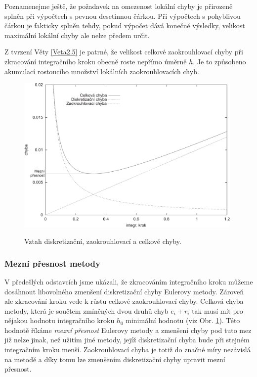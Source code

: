 \documentclass[a4paper, 12pt]{book}
\theoremstyle{definition}
\begin{document}
Poznamenejme ještě, že požadavek na omezenost lokální chyby je přirozeně splněn 
při výpočtech s pevnou desetinnou čárkou. Při výpočtech s pohyblivou čárkou je 
fakticky splněn tehdy, pokud výpočet dává konečné výsledky, velikost maximální 
lokální chyby ale nelze předem určit.

Z tvrzení Věty \ref{Veta2.5} je patrné, že velikost celkové zaokrouhlovací chyby
při zkracování integračního kroku obecně roste nepřímo úměrně $h$. Je to způsobeno
akumulací rostoucího množství lokálních zaokrouhlovacích chyb.

\begin{figure}[ht]
\centering
\includegraphics[width=0.98\textwidth]{chyby}\\
\caption[]{Vztah diskretizační, zaokrouhlovací a celkové chyby.}
\label{chyby}
\end{figure}
\subsubsection{Mezní přesnost metody}
V předešlých odstavcích jsme ukázali, že zkracováním integračního kroku můžeme
dosáhnout libovolného zmenšení diskretizační chyby Eulerovy metody. Zároveň 
ale zkracování kroku vede k růstu celkové zaokrouhlovací chyby. Celková chyba 
metody, která je součtem zmíněných dvou druhů chyb $e_i+r_i$ tak musí mít
pro nějakou hodnotu integračního kroku $h_0$ minimální hodnotu (viz Obr. \ref{chyby}). 
Této hodnotě říkáme {\em mezní přesnost} Eulerovy metody a zmenšení chyby pod tuto 
mez již nelze jinak, než užitím jiné metody, jejíž diskretizační chyba bude při
stejném integračním kroku menší. Zaokrouhlovací chyba je totiž do značné míry 
nezávislá na metodě a díky tomu lze zmenšením diskretizační chyby upravit mezní 
přesnost.
\end{document}
